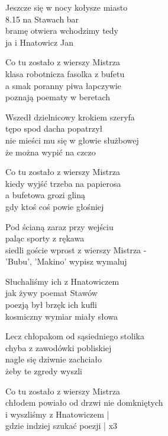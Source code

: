 
\begin{text}
    Jeszcze się w nocy kołysze miasto\\
    8.15 na Stawach bar\\
    bramę otwiera wchodzimy tedy\\
    ja i Hnatowicz Jan

    Co tu zostało z wierszy Mistrza\\
    klasa robotnicza fasolka z bufetu\\
    a smak poranny piwa łapczywie\\
    poznają poematy w beretach

    Wszedł dzielnicowy krokiem szeryfa\\
    tępo spod dacha popatrzył\\
    nie mieści mu się w głowie służbowej\\
    że można wypić na czczo

    Co tu zostało z wierszy Mistrza\\
    kiedy wyjść trzeba na papierosa\\
    a bufetowa grozi gliną\\
    gdy ktoś coś powie głośniej

    Pod ścianą zaraz przy wejściu\\
    paląc sporty z rękawa\\
    siedli goście wprost z wierszy Mistrza -\\
    'Bubu', 'Makino' wypisz wymaluj

    Słuchaliśmy ich z Hnatowiczem\\
    jak żywy poemat Stawów\\
    poezją był brzęk ich kufli\\
    kosmiczny wymiar miały słowa

    Lecz chłopakom od sąsiedniego stolika\\
    chyba z zawodówki pobliskiej\\
    nagle się dziwnie zachciało\\
    żeby te zgredy wyszli

    Co tu zostało z wierszy Mistrza\\
    chłodem powiało od drzwi nie domkniętych\\
    i wyszliśmy z Hnatowiczem |\\
    gdzie indziej szukać poezji | x3
\end{text}
\begin{chord}

\end{chord}